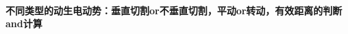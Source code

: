 \documentclass{ctexbook}
\begin{document}
	\hspace*{\fill}
	
	\hspace*{\fill}
	
	\hspace*{\fill}
	
	\hspace*{\fill}
	
	\hspace*{\fill}
	
	\hspace*{\fill}
	
	\hspace*{\fill}
		
	\paragraph{不同类型的动生电动势：垂直切割or不垂直切割，平动or转动，有效距离的判断and计算}~{}
	\\
	\indent
	
	\hspace*{\fill}
	
	\hspace*{\fill}
	
	\hspace*{\fill}
	
	\hspace*{\fill}
	
	\hspace*{\fill}
	
	\hspace*{\fill}
	
	\hspace*{\fill}
	
	\hspace*{\fill}
	
	\hspace*{\fill}
	
	\hspace*{\fill}
	
	\hspace*{\fill}
	
	\hspace*{\fill}
	
	\hspace*{\fill}
	
	\hspace*{\fill}
	
	\hspace*{\fill}
	
	\hspace*{\fill}
	
\end{document}
